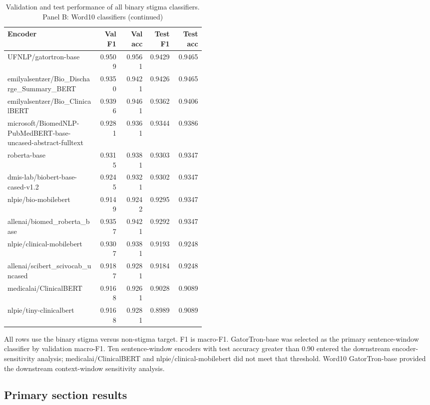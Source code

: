 \documentclass[unnumsec,webpdf,contemporary,large]{oup-authoring-template}
\begin{document}
\begin{table}[H]
\ContinuedFloat
\caption{Validation and test performance of all binary stigma classifiers. Panel B: Word10 classifiers (continued)}
\footnotesize
\setlength{\tabcolsep}{3pt}
\begin{tabular}{@{}p{0.46\linewidth}rrrr@{}}
\toprule
Encoder & Val F1 & Val acc & Test F1 & Test acc \\
\midrule
UFNLP/gatortron-base & 0.9509 & 0.9561 & 0.9429 & 0.9465 \\
emilyalsentzer/Bio\_Discharge\_Summary\_BERT & 0.9350 & 0.9421 & 0.9426 & 0.9465 \\
emilyalsentzer/Bio\_ClinicalBERT & 0.9396 & 0.9461 & 0.9362 & 0.9406 \\
microsoft/BiomedNLP-PubMedBERT-base-uncased-abstract-fulltext & 0.9281 & 0.9361 & 0.9344 & 0.9386 \\
roberta-base & 0.9315 & 0.9381 & 0.9303 & 0.9347 \\
dmis-lab/biobert-base-cased-v1.2 & 0.9245 & 0.9321 & 0.9302 & 0.9347 \\
nlpie/bio-mobilebert & 0.9149 & 0.9242 & 0.9295 & 0.9347 \\
allenai/biomed\_roberta\_base & 0.9357 & 0.9421 & 0.9292 & 0.9347 \\
nlpie/clinical-mobilebert & 0.9307 & 0.9381 & 0.9193 & 0.9248 \\
allenai/scibert\_scivocab\_uncased & 0.9187 & 0.9281 & 0.9184 & 0.9248 \\
medicalai/ClinicalBERT & 0.9168 & 0.9261 & 0.9028 & 0.9089 \\
nlpie/tiny-clinicalbert & 0.9168 & 0.9281 & 0.8989 & 0.9089 \\
\bottomrule
\end{tabular}
\end{table}

\noindent\footnotesize All rows use the binary stigma versus non-stigma target. F1 is macro-F1. GatorTron-base was selected as the primary sentence-window classifier by validation macro-F1. Ten sentence-window encoders with test accuracy greater than 0.90 entered the downstream encoder-sensitivity analysis; medicalai/ClinicalBERT and nlpie/clinical-mobilebert did not meet that threshold. Word10 GatorTron-base provided the downstream context-window sensitivity analysis.\normalsize

\subsection{Primary section results}
\end{document}
